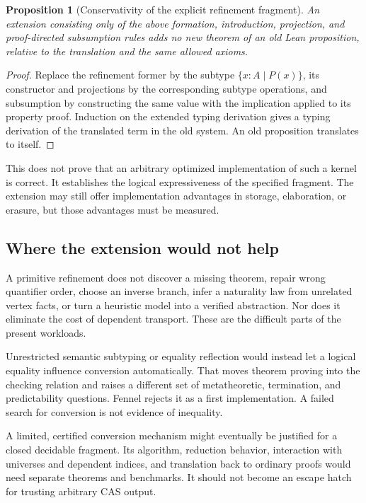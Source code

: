 \documentclass[11pt,a4paper]{article}
\newtheorem{proposition}[theorem]{Proposition}
\theoremstyle{definition}
\theoremstyle{remark}
\begin{document}
\begin{proposition}[Conservativity of the explicit refinement fragment]
An extension consisting only of the above formation, introduction, projection,
and proof-directed subsumption rules adds no new theorem of an old Lean
proposition, relative to the translation and the same allowed axioms.
\end{proposition}
\begin{proof}
Replace the refinement former by the subtype $\{x:A\mid P(x)\}$, its constructor
and projections by the corresponding subtype operations, and subsumption by
constructing the same value with the implication applied to its property proof.
Induction on the extended typing derivation gives a typing derivation of the
translated term in the old system. An old proposition translates to itself.
\end{proof}

This does not prove that an arbitrary optimized implementation of such a kernel
is correct. It establishes the logical expressiveness of the specified
fragment. The extension may still offer implementation advantages in storage,
elaboration, or erasure, but those advantages must be measured.

\subsection{Where the extension would not help}
A primitive refinement does not discover a missing theorem, repair wrong
quantifier order, choose an inverse branch, infer a naturality law from unrelated
vertex facts, or turn a heuristic model into a verified abstraction. Nor does
it eliminate the cost of dependent transport. These are the difficult parts of
the present workloads.

Unrestricted semantic subtyping or equality reflection would instead let a
logical equality influence conversion automatically. That moves theorem proving
into the checking relation and raises a different set of metatheoretic,
termination, and predictability questions. Fennel rejects it as a first
implementation. A failed search for conversion is not evidence of inequality.

A limited, certified conversion mechanism might eventually be justified for a
closed decidable fragment. Its algorithm, reduction behavior, interaction with
universes and dependent indices, and translation back to ordinary proofs would
need separate theorems and benchmarks. It should not become an escape hatch
for trusting arbitrary CAS output.
\end{document}
